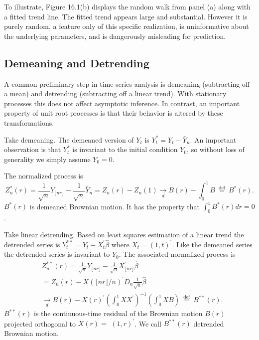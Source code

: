 \documentclass[10pt]{article}
\begin{document}
To illustrate, Figure 16.1(b) displays the random walk from panel (a) along with a fitted trend line. The fitted trend appears large and substantial. However it is purely random, a feature only of this specific realization, is uninformative about the underlying parameters, and is dangerously misleading for prediction.

\subsection{Demeaning and Detrending}
A common preliminary step in time series analysis is demeaning (subtracting off a mean) and detrending (subtracting off a linear trend). With stationary processes this does not affect asymptotic inference. In contrast, an important property of unit root processes is that their behavior is altered by these transformations.

Take demeaning. The demeaned version of $Y_{t}$ is $Y_{t}^{*}=Y_{t}-\bar{Y}_{n}$. An important observation is that $Y_{t}^{*}$ is invariant to the initial condition $Y_{0}$, so without loss of generality we simply assume $Y_{0}=0$.

The normalized process is
$$
Z_{n}^{*}(r)=\frac{1}{\sqrt{n}} Y_{\lfloor n r\rfloor}-\frac{1}{\sqrt{n}} \bar{Y}_{n}=Z_{n}(r)-Z_{n}(1) \underset{d}{\longrightarrow} B(r)-\int_{0}^{1} B \stackrel{\text { def }}{=} B^{*}(r) .
$$
$B^{*}(r)$ is demeaned Brownian motion. It has the property that $\int_{0}^{1} B^{*}(r) d r=0$.

Take linear detrending. Based on least squares estimation of a linear trend the detrended series is $Y_{t}^{* *}=Y_{t}-X_{t}^{\prime} \widehat{\beta}$ where $X_{t}=(1, t)^{\prime}$. Like the demeaned series the detrended series is invariant to $Y_{0}$. The associated normalized process is
$$
\begin{aligned}
& Z_{n}^{* *}(r)=\frac{1}{\sqrt{n}} Y_{\lfloor n r\rfloor}-\frac{1}{\sqrt{n}} X_{\lfloor n r\rfloor}^{\prime} \widehat{\beta} \\
& =Z_{n}(r)-X(\lfloor n r\rfloor / n)^{\prime} D_{n} \frac{1}{\sqrt{n}} \widehat{\beta} \\
& \underset{d}{\longrightarrow} B(r)-X(r)^{\prime}\left(\int_{0}^{1} X X^{\prime}\right)^{-1}\left(\int_{0}^{1} X B\right) \stackrel{\text { def }}{=} B^{* *}(r) .
\end{aligned}
$$
$B^{* *}(r)$ is the continuous-time residual of the Brownian motion $B(r)$ projected orthogonal to $X(r)=$ $(1, r)^{\prime}$. We call $B^{* *}(r)$ detrended Brownian motion.
\end{document}
